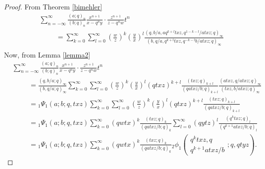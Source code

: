 \documentclass[10pt,a4paper]{amsart}
\begin{document}
\begin{proof}
From Theorem \ref{bimehler}
    \begin{align*}
        &\sum_{n=-\infty}^{\infty}\frac{(a;q)_n}{(b;q)_n}\frac{x^{n+1}}{x-q^ny}\cdot\frac{z^{n+1}}{z-q^nw}t^n\\
        &\hspace{1cm}=\sum_{k=0}^{\infty}\sum_{l=0}^{\infty}\left(\frac{w}{z}\right)^k\left(\frac{y}{x}\right)^l\frac{(q,b/a,aq^{k+l}txz,q^{1-k-l}/atxz;q)_{\infty}}{(b,q/a,q^{k+l}txz,q^{-k-l}b/atxz;q)_{\infty}}\\
    \end{align*}
Now, from Lemma \ref{lemma2}
\begin{align*}
    &\sum_{n=-\infty}^{\infty}\frac{(a;q)_n}{(b;q)_n}\frac{x^{n+1}}{x-q^ny}\cdot\frac{z^{n+1}}{z-q^nw}t^n\\
    &\hspace{1cm}=\frac{(q,b/a;q)_\infty}{(b,q/a;q)_\infty}\sum_{k=0}^{\infty}\sum_{l=0}^{\infty}\left(\frac{w}{z}\right)^k\left(\frac{y}{x}\right)^l(qtxz)^{k+l}\frac{(txz;q)_{k+l}}{(qatxz/b;q)_{k+l}}\frac{(atxz,q/atxz;q)_{\infty}}{(txz,b/atxz;q)_{\infty}}\\
        &\hspace{1cm}={}_{1}\Psi_{1}(a;b;q,txz)\sum_{k=0}^{\infty}\sum_{l=0}^{\infty}\left(\frac{w}{z}\right)^k\left(\frac{y}{x}\right)^l(qtxz)^{k+l}\frac{(txz;q)_{k+l}}{(qatxz/b;q)_{k+l}}\\
        &\hspace{1cm}={}_{1}\Psi_{1}(a;b;q,txz)\sum_{k=0}^{\infty}\left(qwtx\right)^k\frac{(txz;q)_k}{(qatxz/b;q)_k}\sum_{l=0}^{\infty}\left(qytz\right)^l\frac{(q^ktxz;q)_{l}}{(q^{k+1}atxz/b;q)_{l}}\\
        &\hspace{1cm}={}_{1}\Psi_{1}(a;b;q,txz)\sum_{k=0}^{\infty}\left(qwtx\right)^k\frac{(txz;q)_k}{(qatxz/b;q)_k}{}_{2}\phi_{1}\left(
    \begin{array}{c}
         q^ktxz,q \\
         q^{k+1}atxz/b
    \end{array}
    ;q,qtyz
    \right).
\end{align*}
\end{proof}
\end{document}
